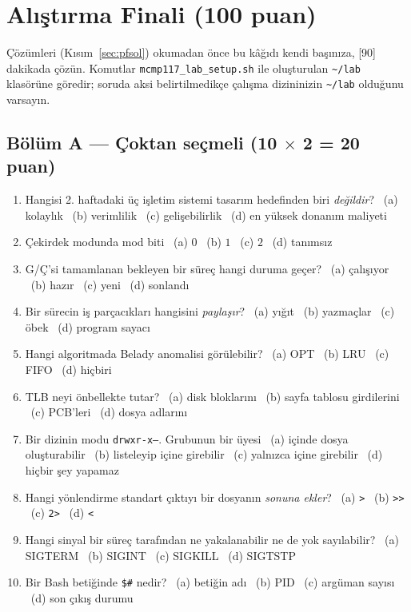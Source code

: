 \documentclass[11pt,a4paper]{article}
\newcommand{\cmd}[1]{\texttt{#1}}
\begin{document}
\section{Alıştırma Finali (100 puan)}
\label{sec:pf}

{\sloppy Çözümleri (Kısım~\ref{sec:pfsol}) okumadan önce bu kâğıdı kendi başınıza, [90] dakikada çözün. Komutlar \cmd{mcmp117\_lab\_setup.sh} ile oluşturulan \texttt{\textasciitilde/lab} klasörüne göredir; soruda aksi belirtilmedikçe çalışma dizininizin \texttt{\textasciitilde/lab} olduğunu varsayın.\par}

\subsection*{Bölüm A --- Çoktan seçmeli (10 $\times$ 2 = 20 puan)}
\begin{enumerate}[leftmargin=1.6em,label=A\arabic*.]
  \item Hangisi 2. haftadaki üç işletim sistemi tasarım hedefinden biri \emph{değildir}? \ (a) kolaylık \ (b) verimlilik \ (c) gelişebilirlik \ (d) en yüksek donanım maliyeti
  \item Çekirdek modunda mod biti \ (a) $0$ \ (b) $1$ \ (c) $2$ \ (d) tanımsız
  \item G/Ç'si tamamlanan bekleyen bir süreç hangi duruma geçer? \ (a) çalışıyor \ (b) hazır \ (c) yeni \ (d) sonlandı
  \item Bir sürecin iş parçacıkları hangisini \emph{paylaşır}? \ (a) yığıt \ (b) yazmaçlar \ (c) öbek \ (d) program sayacı
  \item Hangi algoritmada Belady anomalisi görülebilir? \ (a) OPT \ (b) LRU \ (c) FIFO \ (d) hiçbiri
  \item TLB neyi önbellekte tutar? \ (a) disk bloklarını \ (b) sayfa tablosu girdilerini \ (c) PCB'leri \ (d) dosya adlarını
  \item Bir dizinin modu \texttt{drwxr-x---}. Grubunun bir üyesi \ (a) içinde dosya oluşturabilir \ (b) listeleyip içine girebilir \ (c) yalnızca içine girebilir \ (d) hiçbir şey yapamaz
  \item Hangi yönlendirme standart çıktıyı bir dosyanın \emph{sonuna ekler}? \ (a) \texttt{>} \ (b) \texttt{>>} \ (c) \texttt{2>} \ (d) \texttt{<}
  \item Hangi sinyal bir süreç tarafından ne yakalanabilir ne de yok sayılabilir? \ (a) SIGTERM \ (b) SIGINT \ (c) SIGKILL \ (d) SIGTSTP
  \item Bir Bash betiğinde \texttt{\$\#} nedir? \ (a) betiğin adı \ (b) PID \ (c) argüman sayısı \ (d) son çıkış durumu
\end{enumerate}
\end{document}
